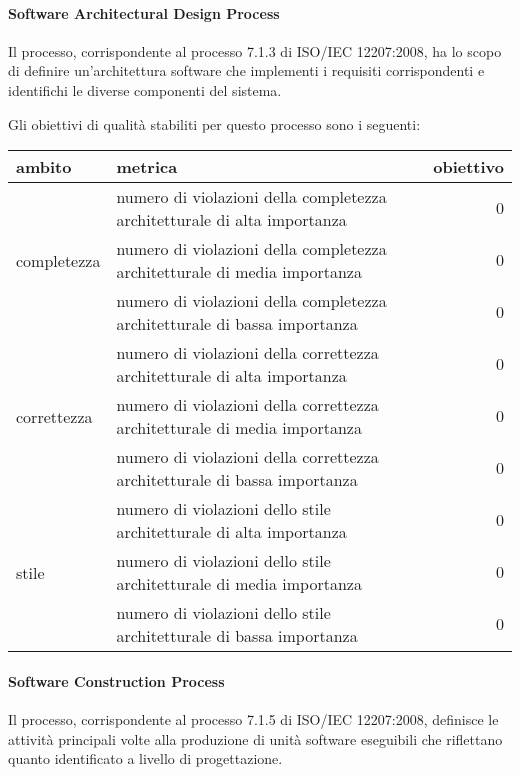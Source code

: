 \paragraph{Software Architectural Design Process}
Il processo, corrispondente al processo 7.1.3 di ISO/IEC 12207:2008, ha lo scopo di definire un'architettura software che implementi i requisiti corrispondenti e identifichi le diverse componenti del sistema.

Gli obiettivi di qualità stabiliti per questo processo sono i seguenti:
\begin{center}
\begin{tabular}{| l | p{6cm} | r |}
	\hline
	\textbf{ambito} & \textbf{metrica} & \textbf{obiettivo} \\
	\hline
	\multirow{3}{*}{completezza} & numero di violazioni della completezza architetturale di alta importanza & $0$ \\
	& numero di violazioni della completezza architetturale di media importanza & $0$ \\
	& numero di violazioni della completezza architetturale di bassa importanza & $0$ \\
	\hline
	\multirow{3}{*}{correttezza} & numero di violazioni della correttezza architetturale di alta importanza & $0$ \\
	& numero di violazioni della correttezza architetturale di media importanza & $0$ \\
	& numero di violazioni della correttezza architetturale di bassa importanza & $0$ \\
	\hline
	\multirow{3}{*}{stile} & numero di violazioni dello stile architetturale di alta importanza & $0$ \\
	& numero di violazioni dello stile architetturale di media importanza & $0$ \\
	& numero di violazioni dello stile architetturale di bassa importanza & $0$ \\
	\hline
\end{tabular}
\end{center}

\paragraph{Software Construction Process}
Il processo, corrispondente al processo 7.1.5 di ISO/IEC 12207:2008, definisce le attività principali volte alla produzione di unità software eseguibili che riflettano quanto identificato a livello di progettazione.

